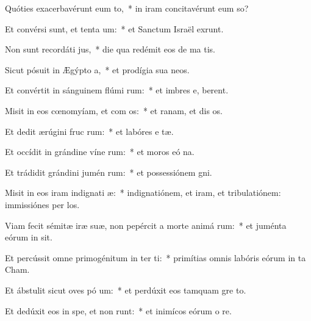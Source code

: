 \item Quóties exacerbavérunt eum  to,~* in iram concitavérunt eum  so?
\item Et convérsi sunt, et tenta um:~* et Sanctum Israël exrunt.
\item Non sunt recordáti  jus,~* die qua redémit eos de ma tis.
\item Sicut pósuit in Ægýpto  a,~* et prodígia sua   neos.
\item Et convértit in sánguinem flúmi rum:~* et imbres e,  berent.
\item Misit in eos cœnomyíam, et com os:~* et ranam, et dis os.
\item Et dedit ærúgini fruc rum:~* et labóres e tæ.
\item Et occídit in grándine víne rum:~* et moros eó  na.
\item Et trádidit grándini jumén rum:~* et possessiónem  gni.
\item Misit in eos iram indignati æ:~* indignatiónem, et iram, et tribulatiónem: immissiónes per  los.
\item Viam fecit sémitæ iræ suæ, non pepércit a morte animá rum:~* et juménta eórum in  sit.
\item Et percússit omne primogénitum in ter ti:~* primítias omnis labóris eórum in ta Cham.
\item Et ábstulit sicut oves pó um:~* et perdúxit eos tamquam gre  to.
\item Et dedúxit eos in spe, et non runt:~* et inimícos eórum o re.
